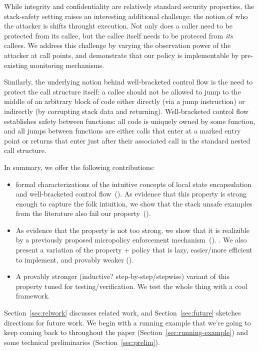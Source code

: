 \documentclass[acmsmall,review,anonymous]{acmart}\settopmatter{printfolios=true,printccs=false,printacmref=false}
\begin{document}
While integrity and confidentiality are relatively standard security
properties, the stack-safety setting raises an interesting additional
challenge:
the notion of who the attacker is shifts throught execution. Not only
does a caller need to be protected from its callee, but the callee
itself needs to be proteced from {\em its} callees.
We address this challenge by varying the observation power
of the attacker at call points, and demonstrate that our policy is
implementable by pre-existing monitoring mechanisms. 

Similarly, the underlying notion behind well-bracketed control flow is
the need to protect the call structure itself: a callee should not be
allowed to jump to the middle of an arbitrary block of code either
directly (via a jump instruction) or indirectly (by corrupting stack
data and returning). Well-bracketed control flow establishes safety between
functions: all code is uniquely owned by some function, and all jumps between functions
are either calls that enter at a marked entry point or returns that enter
just after their associated call in the standard nested call structure.


In summary, we offer the following contributions:
\begin{itemize}
\item {} formal characterizations of the
  intuitive concepts of local state encapsulation and
  well-bracketed control flow~().  As evidence that this
  property is strong enough to capture the folk intuition, we show
  that the stack unsafe examples from the literature also fail our
  property~().
\item As evidence that the property is not too strong, we show that it is
  realizible by
  a previously proposed micropolicy enforcement
  mechanism~(). . We also present a variation of the
  property + policy that is lazy, easier/more efficient to implement,
  and provably weaker ().
\item A provably stronger (inductive? step-by-step/stepwise) variant
  of this property tuned for testing/verification.  We test the whole
  thing with a cool framework. 
\end{itemize}
Section~\ref{sec:relwork} discusses related work, and
Section~\ref{sec:future} sketches directions for future work.
%
We begin with a running example that we're going to keep coming back
to throughout the paper (Section~\ref{sec:running-example}) and some
technical preliminaries (Section~\ref{sec:prelim}).
\end{document}
